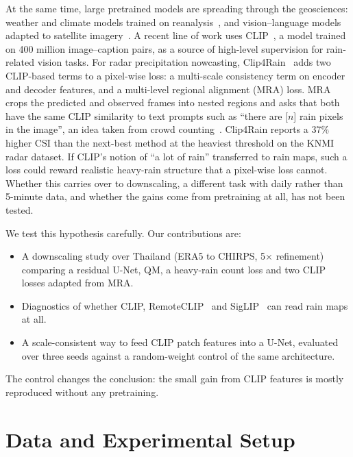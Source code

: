 \documentclass[sigconf]{acmart}
\begin{document}
At the same time, large pretrained models are spreading through the
geosciences: weather and climate models trained on
reanalysis~\cite{lam2023graphcast,price2025gencast,bodnar2025aurora,nguyen2023climax,schmude2024prithviwxc,rasp2024weatherbench2},
and vision--language models adapted to satellite
imagery~\cite{liu2024remoteclip,zhang2024rs5m,wang2024skyscript,kuckreja2024geochat,klemmer2025satclip}.
A recent line of work uses CLIP~\cite{radford2021clip}, a model trained
on 400 million image--caption pairs, as a source of high-level supervision
for rain-related vision tasks. For radar precipitation nowcasting,
Clip4Rain~\cite{li2026clip4rain} adds two CLIP-based terms to a
pixel-wise loss: a multi-scale consistency term on encoder and decoder
features, and a multi-level regional alignment (MRA) loss. MRA crops the
predicted and observed frames into nested regions and asks that both have
the same CLIP similarity to text prompts such as ``there are
[$n$] rain pixels in the image'', an idea taken from crowd
counting~\cite{liang2023crowdclip}. Clip4Rain reports a 37\% higher CSI than
the next-best method at the heaviest threshold on the KNMI radar dataset. If CLIP's notion of
``a lot of rain'' transferred to rain maps, such a loss could reward
realistic heavy-rain structure that a pixel-wise loss cannot. Whether this
carries over to downscaling, a different task with daily rather than
5-minute data, and whether the gains come from pretraining at all, has not
been tested.

We test this hypothesis carefully. Our contributions are:
\begin{itemize}
  \item A downscaling study over Thailand (ERA5 to CHIRPS, 5$\times$
  refinement) comparing a residual U-Net, QM, a heavy-rain count loss and
  two CLIP losses adapted from MRA.
  \item Diagnostics of whether CLIP, RemoteCLIP~\cite{liu2024remoteclip}
  and SigLIP~\cite{zhai2023siglip} can read rain maps at all.
  \item A scale-consistent way to feed CLIP patch features into a U-Net,
  evaluated over three seeds against a random-weight control of the same
  architecture.
\end{itemize}
The control changes the conclusion: the small gain from CLIP features is
mostly reproduced without any pretraining.

\section{Data and Experimental Setup}
\end{document}
